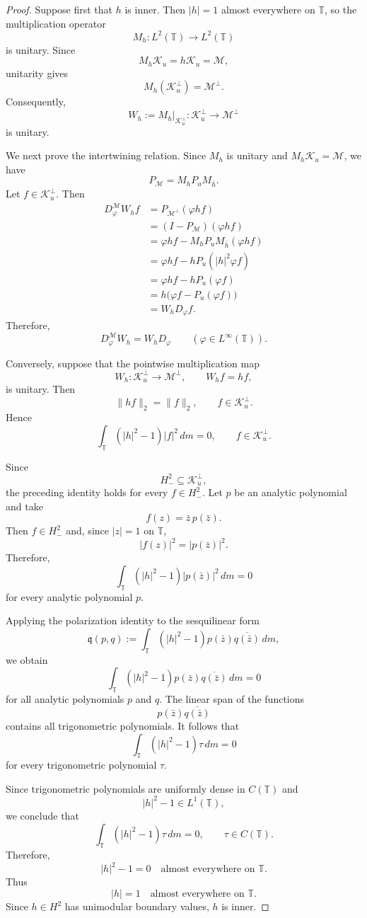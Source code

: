 \documentclass[12pt]{amsart}
\theoremstyle{definition}
\theoremstyle{remark}
\def \T{\mathbb{T}}
\newcommand{\clm}{\mathcal{M}}
\newcommand{\clk}{\mathcal{K}}
\newcommand{\vp}{\varphi}
\newcommand\restr[2]{\ensuremath{\left.#1\right|_{#2}}}
\numberwithin{equation}{section}
\begin{document}
\begin{proof}
Suppose first that $h$ is inner. Then $|h|=1$ almost everywhere on
$\T$, so the multiplication operator
\[
M_h:L^2(\T)\longrightarrow L^2(\T)
\]
is unitary. Since
\[
M_h\clk_u=h\clk_u=\clm,
\]
unitarity gives
\[
M_h(\clk_u^\perp)=\clm^\perp.
\]
Consequently,
\[
W_h:=\restr{M_h}{\clk_u^\perp}:
\clk_u^\perp\longrightarrow\clm^\perp
\]
is unitary.

We next prove the intertwining relation. Since $M_h$ is unitary and
$M_h\clk_u=\clm$, we have
\[
P_\clm=M_hP_uM_{\bar h}.
\]
Let $f\in\clk_u^\perp$. Then
\begin{align*}
D_\vp^\clm W_hf
&=
P_{\clm^\perp}(\vp hf)\\
&=
(I-P_\clm)(\vp hf)\\
&=
\vp hf-M_hP_uM_{\bar h}(\vp hf)\\
&=
\vp hf-hP_u(|h|^2\vp f)\\
&=
\vp hf-hP_u(\vp f)\\
&=
h\bigl(\vp f-P_u(\vp f)\bigr)\\
&=
W_hD_\vp f.
\end{align*}
Therefore,
\[
D_\vp^\clm W_h=W_hD_\vp
\qquad
(\vp\in L^\infty(\T)).
\]

Conversely, suppose that the pointwise multiplication map
\[
W_h:\clk_u^\perp\longrightarrow\clm^\perp,
\qquad
W_hf=hf,
\]
is unitary. Then
\[
\|hf\|_2=\|f\|_2,
\qquad
f\in\clk_u^\perp.
\]
Hence
\[
\int_\T (|h|^2-1)|f|^2\,dm=0,
\qquad
f\in\clk_u^\perp.
\]

Since
\[
H_{-}^2\subseteq\clk_u^\perp,
\]
the preceding identity holds for every $f\in H_{-}^2$. Let $p$ be an analytic polynomial and take
\[
f(z)=\bar z\,p(\bar z).
\]
Then $f\in H_{-}^2$ and, since $|z|=1$ on $\T$,
\[
|f(z)|^2=|p(\bar z)|^2.
\]
Therefore,
\[
\int_\T (|h|^2-1)|p(\bar z)|^2\,dm=0
\]
for every analytic polynomial $p$.

Applying the polarization identity to the sesquilinear form
\[
\mathfrak q(p,q)
:=
\int_\T
(|h|^2-1)p(\bar z)\overline{q(\bar z)}\,dm,
\]
we obtain
\[
\int_\T
(|h|^2-1)p(\bar z)\overline{q(\bar z)}\,dm
=
0
\]
for all analytic polynomials $p$ and $q$. The linear span of the
functions
\[
p(\bar z)\overline{q(\bar z)}
\]
contains all trigonometric polynomials. It follows that
\[
\int_\T (|h|^2-1)\tau\,dm=0
\]
for every trigonometric polynomial $\tau$.

Since trigonometric polynomials are uniformly dense in $C(\T)$ and
\[
|h|^2-1\in L^1(\T),
\]
we conclude that
\[
\int_\T (|h|^2-1)\tau\,dm=0,
\qquad
\tau\in C(\T).
\]
Therefore,
\[
|h|^2-1=0
\quad\text{almost everywhere on }\T.
\]
Thus
\[
|h|=1
\quad\text{almost everywhere on }\T.
\]
Since $h\in H^2$ has unimodular boundary values, $h$ is inner.
\end{proof}
\end{document}
